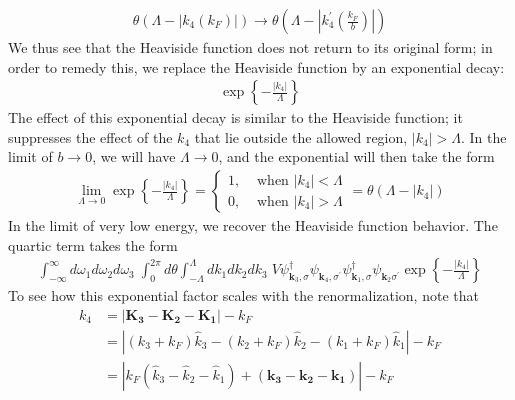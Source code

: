 \documentclass[14pt]{extarticle}
\begin{document}
\begin{equation}\begin{aligned}
\theta(\Lambda - |k_4(k_F)|) \rightarrow \theta\left(\Lambda - \left|k_4^\prime\left(\frac{k_F}{b}\right)\right|\right)
\end{aligned}\end{equation}
We thus see that the Heaviside function does not return to its original form; in order to remedy this, we replace the Heaviside function by an exponential decay:
\begin{equation}\begin{aligned}
	\exp\left\{-\frac{|k_4|}{\Lambda}\right\}
\end{aligned}\end{equation}
The effect of this exponential decay is similar to the Heaviside function; it suppresses the effect of the \(k_4\) that lie outside the allowed region,  \(|k_4| > \Lambda\). In the limit of \(b \rightarrow 0\), we will have \(\Lambda \rightarrow 0\), and the exponential will then take the form
\begin{equation}\begin{aligned}
	\lim_{\Lambda \to 0} \exp\left\{-\frac{|k_4|}{\Lambda}\right\} = \begin{cases} 1, &\text{ when } |k_4|<\Lambda \\ 0, &\text{ when } |k_4|>\Lambda \end{cases} = \theta(\Lambda - |k_4|)
\end{aligned}\end{equation}
In the limit of very low energy, we recover the Heaviside function behavior. The quartic term takes the form
\begin{equation}\begin{aligned}
	\int_{-\infty}^\infty d\omega_1 d\omega_2 d\omega_3\;\int_0^{2\pi} d\theta \int_{-\Lambda}^{\Lambda}dk_1 dk_2 dk_3 \;V\psi_{\mathbf k_3,\sigma}^\dagger\psi_{\mathbf k_4,\sigma^\prime}\psi_{\mathbf k_1,\sigma}^\dagger\psi_{\mathbf k_2\sigma^\prime}\exp\left\{-\frac{|k_4|}{\Lambda}\right\}
\end{aligned}\end{equation}
To see how this exponential factor scales with the renormalization, note that
\begin{equation}\begin{aligned}
\label{k4}
k_4 &= \left|\mathbf{K_3} - \mathbf{K_2} - \mathbf{K_1}\right| - k_F \\
    &= \left|\left(k_3 + k_F\right)\hat k_3 - \left(k_2 + k_F\right)\hat k_2 - \left(k_1 + k_F\right)\hat k_1\right| - k_F\\
    &=\left|k_F\left(\hat k_3 - \hat k_2 - \hat k_1\right) + \left(\mathbf{k_3} - \mathbf{k_2} - \mathbf{k_1}\right)\right| - k_F
\end{aligned}\end{equation}
\end{document}
